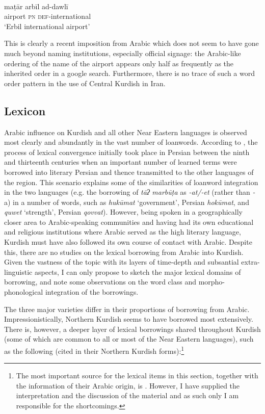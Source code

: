 \documentclass[output=paper]{langsci/langscibook}
\begin{document}
\ea\label{ex:opengin:}
\\
\gll maṭār arbīl ad-dawlī\\
     airport \textsc{pn} \textsc{def}{}-international\\
\glt ‘Erbil international airport’
\z

This is clearly a recent imposition from Arabic which does not seem to have gone much beyond naming institutions, especially official signage: the Arabic-like ordering of the name of the airport appears only half as frequently as the inherited order in a google search. Furthermore, there is no trace of such a word order pattern in the use of Central Kurdish in Iran.  

\subsection{Lexicon}

Arabic influence on Kurdish and all other Near Eastern languages is observed most clearly and abundantly in the vast number of loanwords. According to \citet[97]{Perry2004}, the process of lexical convergence initially took place in Persian between the ninth and thirteenth centuries when an important number of learned terms were borrowed into literary Persian and thence transmitted to the other languages of the region. This scenario explains some of the similarities of loanword integration in the two languages (e.g. the borrowing of \textit{tāʔ} \textit{marbūṭa} as \textit{{}-at/-et} (rather than \textit{{}-}a) in a number of words, such as \textit{hukūmat} ‘government’, Persian \textit{hokūmat}, and \textit{quwet} ‘strength’, Persian \textit{qovvat}). However, being spoken in a geographically closer area to Arabic-speaking communities and having had its own educational and religious institutions where Arabic served as the high literary language, Kurdish must have also followed its own course of contact with Arabic. Despite this, there are no studies on the lexical borrowing from Arabic into Kurdish. Given the vastness of the topic with its layers of time-depth and subsantial extra-linguistic aspects, I can only propose to sketch the major lexical domains of borrowing, and note some observations on the word class and morpho-phonological integration of the borrowings. 

The three major varieties differ in their proportions of borrowing from Arabic. Impressionistically, Northern Kurdish seems to have borrowed most extensively. There is, however, a deeper layer of lexical borrowings shared throughout Kurdish (some of which are common to all or most of the Near Eastern languages), such as the following (cited in their Northern Kurdish forms):\footnote{The most important source for the lexical items in this section, together with the information of their Arabic origin, is \citet{Chyet2003}. However, I have supplied the interpretation and the discussion of the material and as such only I am responsible for the shortcomings.} 
\end{document}
